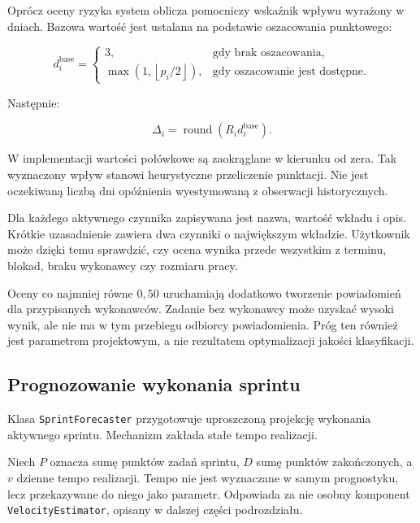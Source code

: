 Oprócz oceny ryzyka system oblicza pomocniczy wskaźnik wpływu wyrażony w dniach. Bazowa wartość jest ustalana na podstawie oszacowania punktowego:

\begin{equation}
    d_i^{\mathrm{base}} =
    \begin{cases}
        3, & \text{gdy brak oszacowania},\\
        \max\left(1,\left\lfloor p_i/2 \right\rfloor\right),
        & \text{gdy oszacowanie jest dostępne}.
    \end{cases}
    \label{eq:ryzyko-dni-bazowe}
\end{equation}

Następnie:

\begin{equation}
    \Delta_i =
    \operatorname{round}\left(R_i d_i^{\mathrm{base}}\right).
    \label{eq:ryzyko-wplyw-dni}
\end{equation}

W implementacji wartości połówkowe są zaokrąglane w kierunku od zera. Tak wyznaczony wpływ stanowi heurystyczne przeliczenie punktacji. Nie jest oczekiwaną liczbą dni opóźnienia wyestymowaną z obserwacji historycznych.

Dla każdego aktywnego czynnika zapisywana jest nazwa, wartość wkładu i opis. Krótkie uzasadnienie zawiera dwa czynniki o największym wkładzie. Użytkownik może dzięki temu sprawdzić, czy ocena wynika przede wszystkim z terminu, blokad, braku wykonawcy czy rozmiaru pracy.

Oceny co najmniej równe \(0{,}50\) uruchamiają dodatkowo tworzenie powiadomień dla przypisanych wykonawców. Zadanie bez wykonawcy może uzyskać wysoki wynik, ale nie ma w tym przebiegu odbiorcy powiadomienia. Próg ten również jest parametrem projektowym, a nie rezultatem optymalizacji jakości klasyfikacji.

\subsection{Prognozowanie wykonania sprintu}

Klasa \texttt{SprintForecaster} przygotowuje uproszczoną projekcję wykonania aktywnego sprintu. Mechanizm zakłada stałe tempo realizacji.

Niech \(P\) oznacza sumę punktów zadań sprintu, \(D\) sumę punktów zakończonych, a \(v\) dzienne tempo realizacji. Tempo nie jest wyznaczane w samym prognostyku, lecz przekazywane do niego jako parametr. Odpowiada za nie osobny komponent \texttt{VelocityEstimator}, opisany w dalszej części podrozdziału.

